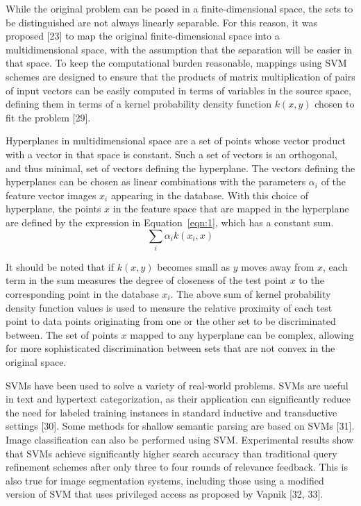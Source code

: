 \documentclass[preprint,12pt]{elsarticle}
\begin{document}
While the original problem can be posed in a finite-dimensional space, the sets to be distinguished are not always linearly separable. For this reason, it was proposed [23] to map the original finite-dimensional space into a multidimensional space, with the assumption that the separation will be easier in that space. To keep the computational burden reasonable, mappings using SVM schemes are designed to ensure that the products of matrix multiplication of pairs of input vectors can be easily computed in terms of variables in the source space, defining them in terms of a kernel probability density function $k(x, y)$ chosen to fit the problem [29].

Hyperplanes in multidimensional space are a set of points whose vector product with a vector in that space is constant. Such a set of vectors is an orthogonal, and thus minimal, set of vectors defining the hyperplane. The vectors defining the hyperplanes can be chosen as linear combinations with the parameters $\alpha_{i}$ of the feature vector images $x_{i}$ appearing in the database. With this choice of hyperplane, the points $x$ in the feature space that are mapped in the hyperplane are defined by the expression 
in Equation~\ref{eqn:1}, which has a constant sum.
\begin{equation}
	\sum_{i} \alpha_{i}k(x_{i},x)
	\label{eqn:1}
\end{equation}

It should be noted that if $k(x, y)$ becomes small as $y$ moves away from $x$, each term in the sum measures the degree of closeness of the test point $x$ to the corresponding point in the database $x_{i}$. The above sum of kernel probability density function values is used to measure the relative proximity of each test point to data points originating from one or the other set to be discriminated between. The set of points $x$ mapped to any hyperplane can be complex, allowing for more sophisticated discrimination between sets that are not convex in the original space.

SVMs have been used to solve a variety of real-world problems. SVMs are useful in text and hypertext categorization, as their application can significantly reduce the need for labeled training instances in standard inductive and transductive settings [30]. Some methods for shallow semantic parsing are based on SVMs [31]. Image classification can also be performed using SVM. Experimental results show that SVMs achieve significantly higher search accuracy than traditional query refinement schemes after only three to four rounds of relevance feedback. This is also true for image segmentation systems, including those using a modified version of SVM that uses privileged access as proposed by Vapnik [32, 33].
\end{document}
